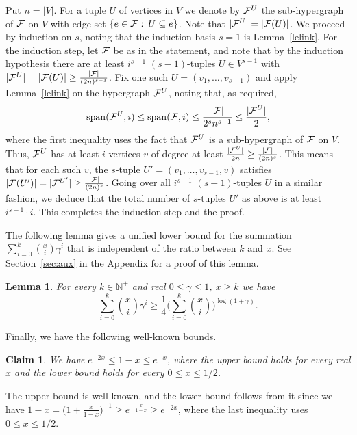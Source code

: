 \documentclass[11pt]{article}
\makeatletter
\renewenvironment{proof}[1][\proofname]
{\par\pushQED{\qed}
	\normalfont\topsep6\p@\@plus6\p@\relax\trivlist
	\item[\hskip\labelsep\bfseries#1\@addpunct{.}]
	\ignorespaces}
{\popQED\endtrivlist\@endpefalse}
\newtheorem{lemma}[theo]{Lemma}
\newtheorem{claim}[theo]{Claim}
\newcommand{\FF}{{\cal F}}
\renewcommand{\wp}{\mathrm{span}}
\renewcommand{\a}{\alpha}
\newcommand{\g}{\gamma}
\newcommand{\sub}{\subseteq}
\newcommand{\N}{\mathbb{N}}
\makeatother
\begin{document}

\begin{proof}
Put $n=|V|$. For a tuple $U$ of vertices in $V$ we denote by $\FF^U$ the sub-hypergraph of $\FF$ on $V$ with edge set $\{e \in \FF \,\colon\, U \sub e\}$. Note that $|\FF^U|=|\FF(U)|$.
We proceed by induction on $s$, noting that the induction basis $s=1$ is Lemma~\ref{lelink}. 
For the induction step, let $\FF$ be as in the statement, and note that by the induction hypothesis there are at least $i^{s-1}$ $(s-1)$-tuples $U \in V^{s-1}$ with $|\FF^U|=|\FF(U)| \ge \frac{|\FF|}{(2n)^{s-1}}$.
Fix one such $U=(v_1,\ldots,v_{s-1})$ 
and apply Lemma~\ref{lelink} on the hypergraph $\FF^U$, noting that, as required,
$$\wp(\FF^U,i) \le \wp(\FF,i) \le \frac{|\FF|}{2^{s} n^{s-1}} \le \frac{|\FF^U|}{2},$$
where the first inequality uses the fact that $\FF^U$ is a sub-hypergraph of $\FF$ on $V$.
Thus, $\FF^U$ has at least $i$ vertices $v$ of degree at least $\frac{|\FF^U|}{2n} \ge \frac{|\FF|}{(2n)^{s}}$. 
This means that for each such $v$, the $s$-tuple $U'=(v_1,\ldots,v_{s-1},v)$ satisfies $|\FF(U')| = |\FF^{U'}| \ge \frac{|\FF|}{(2n)^{s}}$.
Going over all $i^{s-1}$ $(s-1)$-tuples $U$ in a similar fashion, we deduce that the total number of $s$-tuples $U'$ as above is at least $i^{s-1} \cdot i$.
This completes the induction step and the proof. 	
\end {proof}

The following lemma gives
a unified lower bound for the summation $\sum_{i=0}^k \binom{x}{i}\g^i$ that is independent of the ratio between $k$ and $x$.
See Section~\ref{sec:aux} in the Appendix for a proof of this lemma.
\begin{lemma}\label{lemma:113}
	For every $k \in \N^+$ and real $0 \le \g \le 1$, $x \ge k$ we have
	$$\sum_{i=0}^k \binom{x}{i}\g^i 
	\ge \frac14\bigg(\sum_{i=0}^k \binom{x}{i}\bigg)^{\log(1+\g)} .$$
\end{lemma}


Finally, we have the following well-known bounds.
\begin{claim}\label{claim:e}
	We have $e^{-2x} \le 1-x \le e^{-x}$, where the upper bound holds for every real $x$ and the lower bound holds for every $0 \le x \le 1/2$.
\end{claim}
\begin{proof}
	The upper bound is well known, and the lower bound follows from it since we have $1-x = \big(1+\frac{x}{1-x}\big)^{-1} \ge e^{-\frac{x}{1-x}} \ge e^{-2x}$, where the last inequality uses $0 \le x \le 1/2$.
\end{proof}
\end{document}
